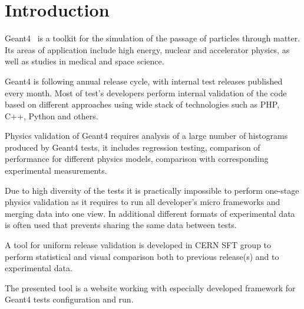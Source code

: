 \section{Introduction}
\label{sec-introduction}
Geant4~\cite{Geant4} is a toolkit for the simulation of the passage of particles through matter. Its areas of application include high energy, nuclear and accelerator physics, as well as studies in medical and space science. 

Geant4 is following annual release cycle, with internal test releases published every month.
Most of test's developers perform internal validation of the code based on different approaches using wide stack of technologies such as PHP, C++, Python and others.

Physics validation of Geant4 requires analysis of a large number of histograms produced by Geant4 tests, it includes regression testing, comparison of performance for different physics models, comparison with corresponding experimental measurements. 

Due to high diversity of the tests it is practically impossible to perform one-stage physics validation as it requires to run all developer's micro frameworks and merging data into one view. In additional different formats of experimental data is often used that prevents sharing the same data between tests.

A tool for uniform release validation is developed in CERN SFT group to perform statistical and visual comparison both to previous release(s) and to experimental data. 

The presented tool is a website working with especially developed framework for Geant4 tests configuration and run.
